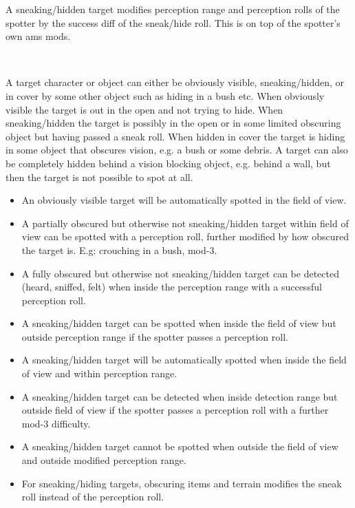 A sneaking/hidden target modifies perception range and perception rolls of the spotter by the success diff of the sneak/hide roll. This is on top of the spotter's own ams mods.

\

A target character or object can either be obviously visible, sneaking/hidden, or in cover by some other object such as hiding in a bush etc. When obviously visible the target is out in the open and not trying to hide. When sneaking/hidden the target is possibly in the open or in some limited obscuring object but having passed a sneak roll. When hidden in cover the target is hiding in some object that obscures vision, e.g. a bush or some debris. A target can also be completely hidden behind a vision blocking object, e.g. behind a wall, but then the target is not possible to spot at all.

\begin{itemize}

\item An obviously visible target will be automatically spotted in the field of view. 

\item A partially obscured but otherwise not sneaking/hidden target within field of view can be spotted with a perception roll, further modified by how obscured the target is. E.g: crouching in a bush, mod-3.

\item A fully obscured but otherwise not sneaking/hidden target can be detected (heard, sniffed, felt) when inside the perception range with a successful perception roll.

\item A sneaking/hidden target can be spotted when inside the field of view but outside perception range if the spotter passes a perception roll.

\item A sneaking/hidden target will be automatically spotted when inside the field of view and within perception range.

\item A sneaking/hidden target can be detected when inside detection range but outside field of view if the spotter passes a perception roll with a further mod-3 difficulty.

\item A sneaking/hidden target cannot be spotted when outside the field of view and outside modified perception range.

\item For sneaking/hiding targets, obscuring items and terrain modifies the sneak roll instead of the perception roll.

\end{itemize}

